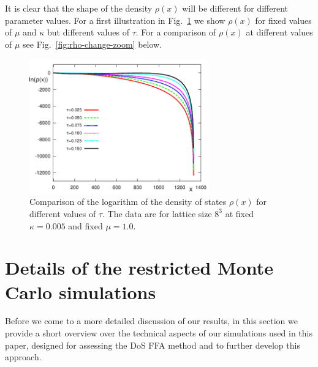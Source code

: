\documentclass[a4paper,11pt]{article}
\begin{document}
It is clear that the shape of the density $\rho(x)$ will be different for different parameter values. For a first illustration 
in Fig.~\ref{fig:rho-tau} we show $\rho(x)$ for fixed values of $\mu$ and $\kappa$ but different values of
$\tau$. For a comparison of $\rho(x)$ at different values of $\mu$ see Fig.~\ref{fig:rho-change-zoom} below.

\begin{figure}[t]
\begin{center}
\includegraphics[width=0.69\textwidth]{rho_tau_new.pdf}
\end{center}
\caption{Comparison of the logarithm of the density of states $\rho(x)$ 
for different values of $\tau$. The data are for lattice size $8^3$ at fixed $\kappa=0.005$ and fixed $\mu=1.0$.}
\label{fig:rho-tau}
\end{figure}


\section{Details of the restricted Monte Carlo simulations}

Before we come to a more detailed discussion of our results, in this section we provide a short overview over the 
technical aspects of our simulations used in this paper, designed for assessing the DoS FFA method and to further 
develop this approach.
\end{document}
